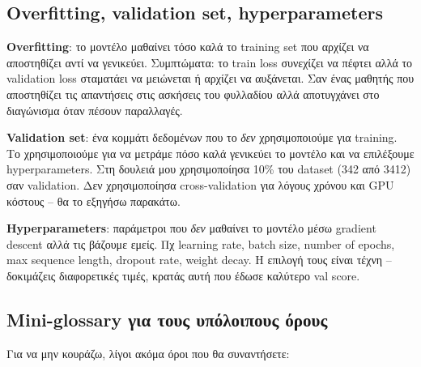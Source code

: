 \documentclass[12pt]{fphw}
\begin{document}
\subsection{Overfitting, validation set, hyperparameters}

\textbf{Overfitting}: το μοντέλο μαθαίνει τόσο καλά το training set που αρχίζει να αποστηθίζει αντί να γενικεύει. Συμπτώματα: το train loss συνεχίζει να πέφτει αλλά το validation loss σταματάει να μειώνεται ή αρχίζει να αυξάνεται. Σαν ένας μαθητής που αποστηθίζει τις απαντήσεις στις ασκήσεις του φυλλαδίου αλλά αποτυγχάνει στο διαγώνισμα όταν πέσουν παραλλαγές.

\textbf{Validation set}: ένα κομμάτι δεδομένων που το \emph{δεν} χρησιμοποιούμε για training. Το χρησιμοποιούμε για να μετράμε πόσο καλά γενικεύει το μοντέλο και να επιλέξουμε hyperparameters. Στη δουλειά μου χρησιμοποίησα 10\% του dataset (342 από 3412) σαν validation. Δεν χρησιμοποίησα cross-validation για λόγους χρόνου και GPU κόστους -- θα το εξηγήσω παρακάτω.

\textbf{Hyperparameters}: παράμετροι που \emph{δεν} μαθαίνει το μοντέλο μέσω gradient descent αλλά τις βάζουμε εμείς. Πχ learning rate, batch size, number of epochs, max sequence length, dropout rate, weight decay. Η επιλογή τους είναι τέχνη -- δοκιμάζεις διαφορετικές τιμές, κρατάς αυτή που έδωσε καλύτερο val score.

\subsection{Mini-glossary για τους υπόλοιπους όρους}

Για να μην κουράζω, λίγοι ακόμα όροι που θα συναντήσετε:
\end{document}
